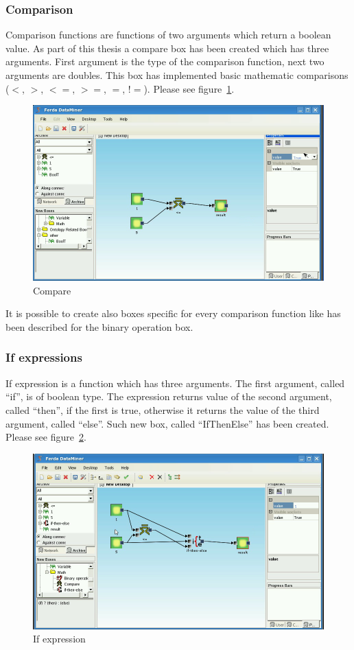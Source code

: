 \documentclass[a4paper,12pt]{book}
\begin{document}
\subsubsection{Comparison}
Comparison functions are functions of two arguments which return a boolean value. As part of this thesis a compare box has been created which has three arguments. First argument is the type of the comparison function, next two arguments are doubles. This box has implemented basic mathematic comparisons ($<$, $>$, $<=$, $>=$, $=$, $!=$). Please see figure~\ref{fig:boxCompare}.
\begin{figure}
	\includegraphics[width=1\textwidth]{compare2.png}
	\caption{Compare}
	\label{fig:boxCompare}
\end{figure}

It is possible to create also boxes specific for every comparison function like has been described for the binary operation box.

\subsubsection{If expressions}
If expression is a function which has three arguments. The first argument, called ``if'', is of boolean type. The expression returns value of the second argument, called ``then'', if the first is true, otherwise it returns the value of the third argument, called ``else''. Such new box, called ``IfThenElse'' has been created. Please see figure~\ref{fig:boxIfThenElse}.
\begin{figure}
\includegraphics[width=1\textwidth]{ifthenelse2.png}
	\caption{If expression}
	\label{fig:boxIfThenElse}
\end{figure}
\end{document}
